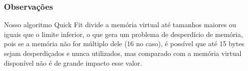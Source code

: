 \documentclass{beamer}
\begin{document}
\begin{frame}
  \frametitle{Observações}
  Nosso algoritmo Quick Fit divide a memória virtual até tamanhos maiores ou iguais que o limite inferior, o que gera um problema de desperdício de memória, pois se a memória não for múltiplo dele (16 no caso),
  é possível que até 15 bytes sejam desperdiçados e nunca utilizados, mas comparado com a memória virtual disponível não é de grande impacto esse valor.
\end{frame}

\end{document}
